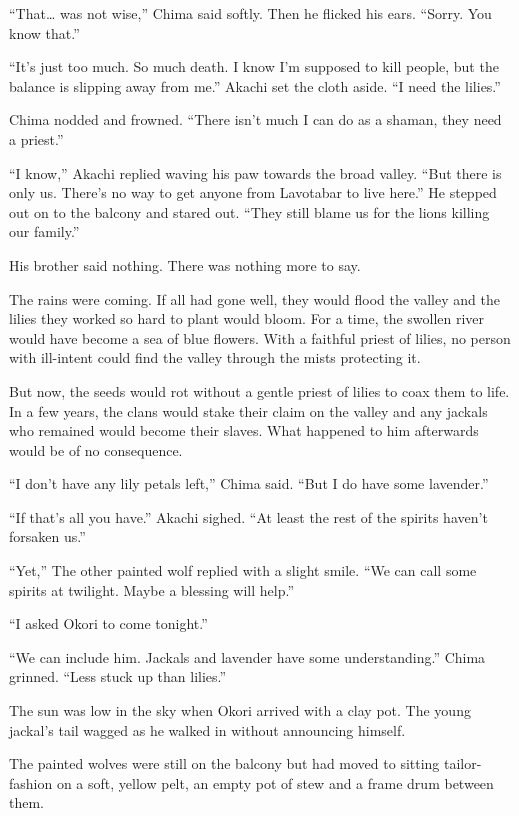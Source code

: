 ``That\ldots{} was not wise,'' Chima said softly. Then he flicked his ears. ``Sorry. You know that.''

``It's just too much. So much death. I know I'm supposed to kill people, but the balance is slipping away from me.'' Akachi set the cloth aside. ``I need the lilies.''

Chima nodded and frowned. ``There isn't much I can do as a shaman, they need a priest.''

``I know,'' Akachi replied waving his paw towards the broad valley. ``But there is only us. There's no way to get anyone from Lavotabar to live here.'' He stepped out on to the balcony and stared out. ``They still blame us for the lions killing our family.''

His brother said nothing. There was nothing more to say.

The rains were coming. If all had gone well, they would flood the valley and the lilies they worked so hard to plant would bloom. For a time, the swollen river would have become a sea of blue flowers. With a faithful priest of lilies, no person with ill-intent could find the valley through the mists protecting it.

But now, the seeds would rot without a gentle priest of lilies to coax them to life. In a few years, the clans would stake their claim on the valley and any jackals who remained would become their slaves. What happened to him afterwards would be of no consequence.

``I don't have any lily petals left,'' Chima said. ``But I do have some lavender.''

``If that's all you have.'' Akachi sighed. ``At least the rest of the spirits haven't forsaken us.''

``Yet,'' The other painted wolf replied with a slight smile. ``We can call some spirits at twilight. Maybe a blessing will help.''

``I asked Okori to come tonight.''

``We can include him. Jackals and lavender have some understanding.'' Chima grinned. ``Less stuck up than lilies.''

\secdiv

\noindent The sun was low in the sky when Okori arrived with a clay pot. The young jackal's tail wagged as he walked in without announcing himself.

The painted wolves were still on the balcony but had moved to sitting tailor-fashion on a soft, yellow pelt, an empty pot of stew and a frame drum between them.

